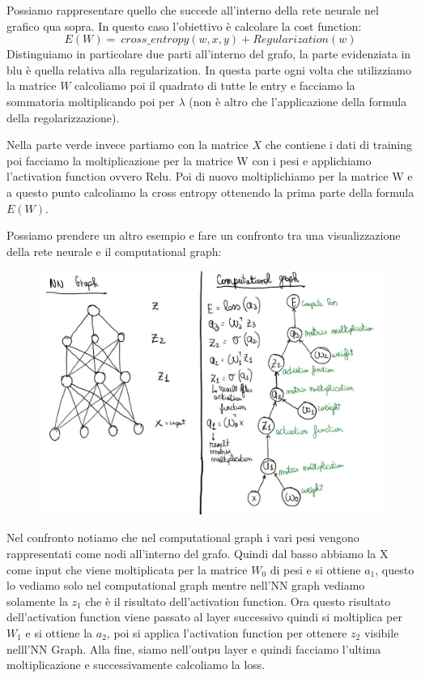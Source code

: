 \documentclass[14pt]{extreport}
\begin{document}
Possiamo rappresentare quello che succede all'interno della rete neurale nel grafico qua sopra. In questo caso l'obiettivo è calcolare la cost
function: $$E(W) = \ cross\_entropy(w,x,y) + Regularization(w)$$ Distinguiamo in particolare due parti all'interno del grafo, la parte evidenziata in
blu è quella relativa alla regularization. In questa parte ogni volta che utilizziamo la matrice $W$ calcoliamo poi il quadrato di tutte le entry e
facciamo la sommatoria moltiplicando poi per $\lambda$ (non è altro che l'applicazione della formula della regolarizzazione). 

Nella parte verde invece partiamo con la matrice $X$ che contiene i dati di training poi facciamo la moltiplicazione per la matrice W con i pesi e
applichiamo l'activation function ovvero Relu. Poi di nuovo moltiplichiamo per la matrice W e a questo punto calcoliamo la cross entropy ottenendo la
prima parte della formula $E(W)$.


Possiamo prendere un altro esempio e fare un confronto tra una visualizzazione della rete neurale e il computational graph:

\begin{figure}[H]
\centering
\includegraphics[width=\linewidth]{397.jpeg}
\end{figure}

Nel confronto notiamo che nel computational graph i vari pesi vengono rappresentati come nodi all'interno del grafo. Quindi dal basso abbiamo la X
come input che viene moltiplicata per la matrice $W_0$ di pesi e si ottiene $a_1$, questo lo vediamo solo nel computational graph mentre nell'NN graph
vediamo solamente la $z_1$ che è il risultato dell'activation function. Ora questo risultato dell'activation function viene passato al layer
successivo quindi si moltiplica per $W_1$ e si ottiene la $a_2$, poi si applica l'activation function per ottenere $z_2$ visibile nelll'NN Graph. Alla
fine, siamo nell'outpu layer e quindi facciamo l'ultima moltiplicazione e successivamente calcoliamo la loss.
\end{document}
